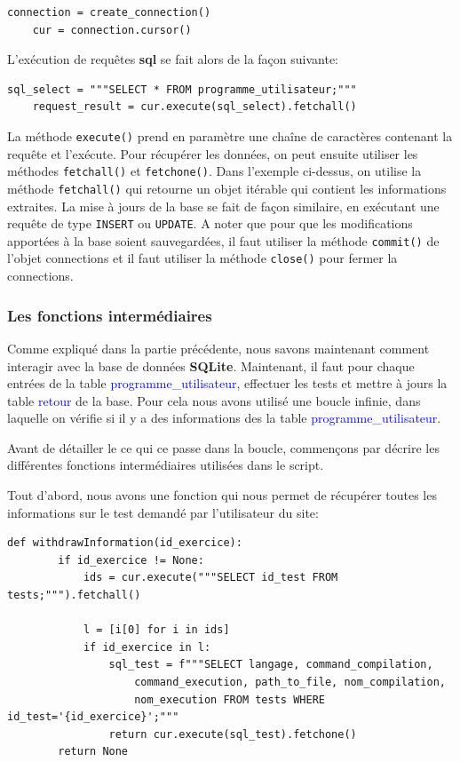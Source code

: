 \documentclass[a4paper]{article}
\renewcommand{\texttt}[2][blue]{\textcolor{#1}{\ttfamily #2}}
\begin{document}
  \begin{lstlisting}[language=PY]%
    connection = create_connection()
    cur = connection.cursor()
  \end{lstlisting}

  L'exécution de requêtes \textbf{sql} se fait alors de la façon suivante:

  \begin{lstlisting}[language=PY]%
    sql_select = """SELECT * FROM programme_utilisateur;"""
    request_result = cur.execute(sql_select).fetchall()
  \end{lstlisting}

  La méthode \lstinline{execute()} prend en paramètre une chaîne de caractères
  contenant la requête et l'exécute. Pour récupérer les données, on peut
  ensuite utiliser les méthodes \lstinline{fetchall()} et
  \lstinline{fetchone()}. Dans l'exemple ci-dessus, on utilise la méthode
  \lstinline{fetchall()} qui retourne un objet itérable qui contient les
  informations extraites. La mise à jours de la base se fait de façon
  similaire, en exécutant une requête de type \lstinline{INSERT} ou
  \lstinline{UPDATE}. A noter que pour que les modifications apportées à la
  base soient sauvegardées, il faut utiliser la méthode \lstinline{commit()} de
  l'objet connections et il faut utiliser la méthode \lstinline{close()} pour
  fermer la connections.


  \subsubsection{Les fonctions intermédiaires}%
  \label{sub:Les fonctions intermédiaires}

  Comme expliqué dans la partie précédente, nous savons maintenant comment
  interagir avec la base de données \textbf{SQLite}. Maintenant, il faut pour
  chaque entrées de la table \texttt{programme\_utilisateur}, effectuer les
  tests et mettre à jours la table \texttt{retour} de la base. Pour cela nous
  avons utilisé une boucle infinie, dans laquelle on vérifie si il y a des
  informations des la table \texttt{programme\_utilisateur}.

  Avant de détailler le ce qui ce passe dans la boucle, commençons par décrire
  les différentes fonctions intermédiaires utilisées dans le script.

  Tout d'abord, nous avons une fonction qui nous permet de récupérer toutes les
  informations sur le test demandé par l'utilisateur du site:

  \begin{lstlisting}[language=PY]%
    def withdrawInformation(id_exercice):
        if id_exercice != None:
            ids = cur.execute("""SELECT id_test FROM tests;""").fetchall()

            l = [i[0] for i in ids]
            if id_exercice in l:
                sql_test = f"""SELECT langage, command_compilation,
                    command_execution, path_to_file, nom_compilation,
                    nom_execution FROM tests WHERE id_test='{id_exercice}';"""
                return cur.execute(sql_test).fetchone()
        return None
  \end{lstlisting}
\end{document}
